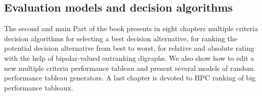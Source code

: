 % 
%
%

\begin{partbacktext}
  \part{Evaluation models and decision algorithms}

  The second and main Part of the book presents in eight chapters multiple criteria decision algorithms for selecting a best decision alternative, for ranking the potential decision alternative from best to worst, for relative and absolute rating with the help of bipolar-valued outranking digraphs. We also show how to edit a new multiple criteria performance tableau and present several models of random performance tableau generators. A last chapter is devoted to HPC ranking of big performance tableaux.
\end{partbacktext}